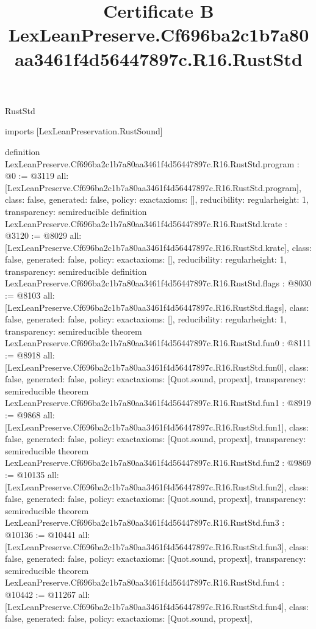 \begin{lexlean}{RustStd}
\title{Certificate B LexLeanPreserve.Cf696ba2c1b7a80aa3461f4d56447897c.R16.RustStd}
\begin{coremodule}
imports [LexLeanPreservation.RustSound]

definition LexLeanPreserve.Cf696ba2c1b7a80aa3461f4d56447897c.R16.RustStd.program : @0 := @3119 {
  all: [LexLeanPreserve.Cf696ba2c1b7a80aa3461f4d56447897c.R16.RustStd.program],
  class: false,
  generated: false,
  policy: exact{axioms: []},
  reducibility: regular{height: 1},
  transparency: semireducible
}
definition LexLeanPreserve.Cf696ba2c1b7a80aa3461f4d56447897c.R16.RustStd.krate : @3120 := @8029 {
  all: [LexLeanPreserve.Cf696ba2c1b7a80aa3461f4d56447897c.R16.RustStd.krate],
  class: false,
  generated: false,
  policy: exact{axioms: []},
  reducibility: regular{height: 1},
  transparency: semireducible
}
definition LexLeanPreserve.Cf696ba2c1b7a80aa3461f4d56447897c.R16.RustStd.flags : @8030 := @8103 {
  all: [LexLeanPreserve.Cf696ba2c1b7a80aa3461f4d56447897c.R16.RustStd.flags],
  class: false,
  generated: false,
  policy: exact{axioms: []},
  reducibility: regular{height: 1},
  transparency: semireducible
}
theorem LexLeanPreserve.Cf696ba2c1b7a80aa3461f4d56447897c.R16.RustStd.fun0 : @8111 := @8918 {
  all: [LexLeanPreserve.Cf696ba2c1b7a80aa3461f4d56447897c.R16.RustStd.fun0],
  class: false,
  generated: false,
  policy: exact{axioms: [Quot.sound, propext]},
  transparency: semireducible
}
theorem LexLeanPreserve.Cf696ba2c1b7a80aa3461f4d56447897c.R16.RustStd.fun1 : @8919 := @9868 {
  all: [LexLeanPreserve.Cf696ba2c1b7a80aa3461f4d56447897c.R16.RustStd.fun1],
  class: false,
  generated: false,
  policy: exact{axioms: [Quot.sound, propext]},
  transparency: semireducible
}
theorem LexLeanPreserve.Cf696ba2c1b7a80aa3461f4d56447897c.R16.RustStd.fun2 : @9869 := @10135 {
  all: [LexLeanPreserve.Cf696ba2c1b7a80aa3461f4d56447897c.R16.RustStd.fun2],
  class: false,
  generated: false,
  policy: exact{axioms: [Quot.sound, propext]},
  transparency: semireducible
}
theorem LexLeanPreserve.Cf696ba2c1b7a80aa3461f4d56447897c.R16.RustStd.fun3 : @10136 := @10441 {
  all: [LexLeanPreserve.Cf696ba2c1b7a80aa3461f4d56447897c.R16.RustStd.fun3],
  class: false,
  generated: false,
  policy: exact{axioms: [Quot.sound, propext]},
  transparency: semireducible
}
theorem LexLeanPreserve.Cf696ba2c1b7a80aa3461f4d56447897c.R16.RustStd.fun4 : @10442 := @11267 {
  all: [LexLeanPreserve.Cf696ba2c1b7a80aa3461f4d56447897c.R16.RustStd.fun4],
  class: false,
  generated: false,
  policy: exact{axioms: [Quot.sound, propext]},
}
\end{coremodule}
\end{lexlean}
